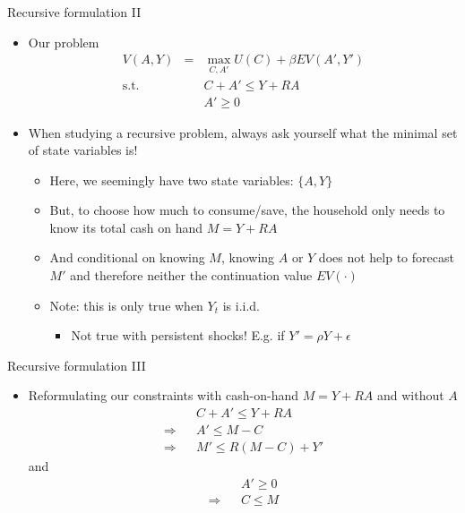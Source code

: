 \documentclass[9pt]{beamer}
\newcommand{\bit}{\begin{itemize}}
\newcommand{\eit}{\end{itemize}}
\newcommand{\bc}{\color{blue}}
\begin{document}
\begin{frame}{Recursive formulation II}

\bit
\setlength\itemsep{2em}

\item Our problem
\begin{eqnarray}
V(A, Y) &=& \max_{C, A'} U(C) + \beta E V(A', Y') \nonumber \\
\text{s.t.} && C + A' \leq Y + R A \nonumber \\
&& A' \geq 0 \nonumber
\end{eqnarray}

\item When studying a recursive problem, always ask yourself what the minimal set of state variables is!
\bit
\setlength\itemsep{0.5em}
	\item Here, we seemingly have two state variables: $\{A, Y\}$

	\item But, to choose how much to consume/save, the household only needs to know its total {\bc cash on hand} $M = Y + RA$
	
	\item And conditional on knowing $M$, knowing $A$ or $Y$ does not help to forecast $M'$ and therefore neither the continuation value $E V(\cdot) $ 
	
	\item Note: this is only true when $Y_t$ is i.i.d.
	\bit
	\item Not true with persistent shocks! E.g. if $Y' = \rho Y + \epsilon$
	\eit
\eit

\eit

\end{frame}


\begin{frame}{Recursive formulation III}

\bit
\setlength\itemsep{1em}

\item Reformulating our constraints with cash-on-hand $M=Y+RA$ and without $A$
\begin{eqnarray}
&& C + A' \leq Y + R A \nonumber \\
\Rightarrow &&  A' \leq M-C \nonumber \\
\Rightarrow &&  M' \leq R(M-C)+Y' \nonumber
\end{eqnarray}
and
\begin{eqnarray}
&& A' \geq 0 \nonumber \\
\Rightarrow &&  C \leq M \nonumber 
\end{eqnarray}

\eit

\end{frame}
\end{document}
